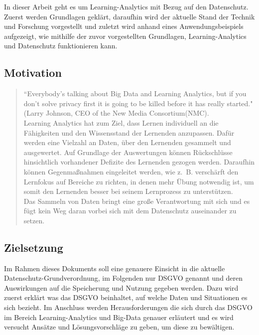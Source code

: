 \documentclass[a4paper, 12pt]{article}
\begin{document}
In dieser Arbeit geht es um Learning-Analytics mit Bezug auf den Datenschutz. Zuerst werden Grundlagen geklärt, daraufhin wird der aktuelle Stand der Technik und Forschung vorgestellt und zuletzt wird anhand eines Anwendungsbeispiels aufgezeigt, wie mithilfe der zuvor vorgestellten Grundlagen, Learning-Analytics und Datenschutz funktionieren kann.

\subsection{Motivation}

\begin{quote}
    ``Everybody’s talking about Big Data and Learning Analytics, but if you don’t solve privacy first it is going to be killed before it has really started."(Larry Johnson, CEO of the New Media Consortium(NMC). \\
    
    Learning Analytics hat zum Ziel, dass Lernen individuell an die Fähigkeiten und den Wissensstand der Lernenden anzupassen. Dafür werden eine Vielzahl an Daten, über den Lernenden gesammelt und ausgewertet. Auf Grundlage der Auswertungen können Rückschlüsse hinsichtlich vorhandener Defizite des Lernenden gezogen werden.
    Daraufhin können Gegenmaßnahmen eingeleitet werden, wie z.~B. verschärft den Lernfokus auf Bereiche zu richten, in denen mehr Übung notwendig ist, um somit den Lernenden besser bei seinem Lernprozess zu unterstützen. \\
    
    Das Sammeln von Daten bringt eine große Verantwortung mit sich und es fügt kein Weg daran vorbei sich mit dem Datenschutz auseinander zu setzen.
\end{quote}

\subsection{Zielsetzung}

Im Rahmen dieses Dokuments soll eine genauere Einsicht in die aktuelle Datenschutz-Grundverordnung, im Folgenden nur DSGVO genannt und deren Auswirkungen auf die Speicherung und Nutzung gegeben werden. Dazu wird zuerst erklärt was das DSGVO beinhaltet, auf welche Daten und Situationen es sich bezieht. Im Anschluss werden Herausforderungen die sich durch das DSGVO im Bereich Learning-Analytics und Big-Data genauer erläutert und es wird versucht Ansätze und Lösungsvorschläge zu geben, um diese zu bewältigen.
\end{document}
